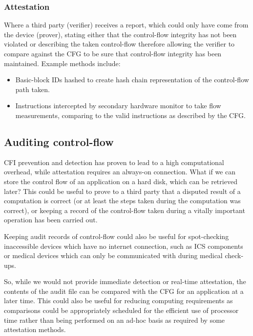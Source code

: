 \subsubsection{Attestation}
Where a third party (verifier) receives a report, which could only have come from the device (prover), stating either that the control-flow integrity has not been violated or describing the taken control-flow therefore allowing the verifier to compare against the CFG to be sure that control-flow integrity has been maintained. Example methods include:
\begin{itemize}
	\item Basic-block IDs hashed to create hash chain representation of the control-flow path taken.
	\item Instructions intercepted by secondary hardware monitor to take flow measurements, comparing to the valid instructions as described by the CFG.
\end{itemize}

\subsection{Auditing control-flow}
CFI prevention and detection has proven to lead to a high computational overhead, while attestation requires an always-on connection. What if we can store the control flow of an application on a hard disk, which can be retrieved later? This could be useful to prove to a third party that a disputed result of a computation is correct (or at least the steps taken during the computation was correct), or keeping a record of the control-flow taken during a vitally important operation has been carried out.

Keeping audit records of control-flow could also be useful for spot-checking inaccessible devices which have no internet connection, such as ICS components or medical devices which can only be communicated with during medical check-ups.

So, while we would not provide immediate detection or real-time attestation, the contents of the audit file can be compared with the CFG for an application at a later time. This could also be useful for reducing computing requirements as comparisons could be appropriately scheduled for the efficient use of processor time rather than being performed on an ad-hoc basis as required by some attestation methods.
